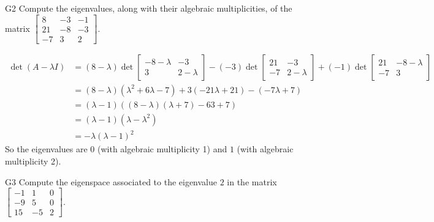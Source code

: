 \documentclass{sbgLAquiz}
\begin{document}
\begin{problem}{G2} 
Compute the eigenvalues, along with their algebraic multiplicities, of the matrix $ \begin{bmatrix} 8 & -3 & -1 \\ 21 & -8 & -3 \\ -7 & 3 & 2\end{bmatrix}$.
\end{problem}
\begin{solution}
\begin{align*}
\det(A-\lambda I) &= (8-\lambda) \det \begin{bmatrix} -8-\lambda & -3 \\ 3 & 2-\lambda \end{bmatrix}-(-3) \det \begin{bmatrix} 21 & -3 \\ -7 & 2-\lambda \end{bmatrix} +(-1) \det \begin{bmatrix} 21 & -8-\lambda \\ -7 & 3 \end{bmatrix} \\
&=(8-\lambda)\left(\lambda ^2+6\lambda-7\right)+3\left(-21\lambda + 21 \right)-\left(-7\lambda +7 \right) \\
&=(\lambda -1) \left( (8-\lambda)(\lambda+7)-63+7 \right) \\
&= (\lambda-1)(\lambda -\lambda ^2) \\
&= -\lambda (\lambda-1)^2
\end{align*}
So the eigenvalues are $0$ (with algebraic multiplicity 1) and $1$ (with algebraic multiplicity 2).
\end{solution}
\begin{extract}\newpage\end{extract}
\begin{problem}{G3}
Compute the eigenspace associated to the eigenvalue $2$ in the matrix $\begin{bmatrix} -1 & 1 & 0 \\ -9 & 5 & 0 \\ 15 & -5 & 2 \end{bmatrix}$.
\end{problem}
\end{document}

